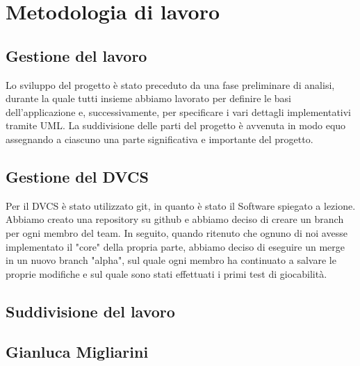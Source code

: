 \documentclass[a4paper,12pt]{report}
\begin{document}
\section{Metodologia di lavoro}
\subsection{Gestione del lavoro}
Lo sviluppo del progetto è stato preceduto da una fase preliminare di analisi, durante la quale tutti insieme abbiamo lavorato per definire le basi dell'applicazione e, successivamente, per specificare i vari dettagli implementativi tramite UML.
La suddivisione delle parti del progetto è avvenuta in modo equo assegnando a ciascuno una parte significativa e importante del progetto.
\subsection*{Gestione del DVCS}
Per il DVCS è stato utilizzato git, in quanto è stato il Software spiegato a lezione. Abbiamo creato una repository su github e abbiamo deciso di creare un branch per ogni membro del team. In seguito, quando ritenuto che ognuno di noi avesse implementato il "core" della propria parte, abbiamo deciso di eseguire un merge in un nuovo branch "alpha", sul quale ogni membro ha continuato a salvare le proprie modifiche e sul quale sono stati effettuati i primi test di giocabilità.
\newpage

\subsection*{Suddivisione del lavoro}
\subsection{Gianluca Migliarini}
\end{document}
